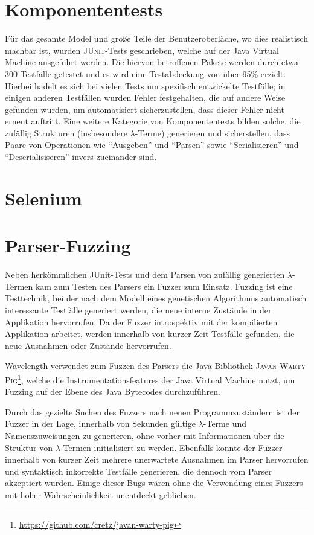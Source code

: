 \documentclass[parskip=full,11pt,openany]{scrreprt}
\begin{document}
\section{Komponententests}
Für das gesamte Model und große Teile der Benutzeroberläche, wo dies realistisch
machbar ist, wurden \textsc{JUnit}-Tests geschrieben, welche auf der Java Virtual
Machine ausgeführt werden. Die hiervon betroffenen Pakete werden durch etwa 300
Testfälle getestet und es wird eine Testabdeckung von über 95\% erzielt. Hierbei
hadelt es sich bei vielen Tests um spezifisch entwickelte Testfälle; in einigen
anderen Testfällen wurden Fehler festgehalten, die auf andere Weise gefunden
wurden, um automatisiert sicherzustellen, dass dieser Fehler nicht erneut
auftritt. Eine weitere Kategorie von Komponententests bilden solche, die zufällig Strukturen
(insbesondere $\lambda$-Terme) generieren und sicherstellen, dass Paare von
Operationen wie \enquote{Ausgeben} und \enquote{Parsen} sowie \enquote{Serialisieren}
und \enquote{Deserialisiseren} invers zueinander sind.

\section{Selenium}

\section{Parser-Fuzzing}
Neben herkömmlichen JUnit-Tests und dem Parsen von zufällig generierten
$\lambda$-Termen kam zum Testen des Parsers ein Fuzzer zum Einsatz. Fuzzing ist
eine Testtechnik, bei der nach dem Modell eines genetischen Algorithmus
automatisch interessante Testfälle generiert werden, die neue interne Zustände
in der Applikation hervorrufen. Da der Fuzzer introspektiv mit der kompilierten
Applikation arbeitet, werden innerhalb von kurzer Zeit Testfälle gefunden, die
neue Ausnahmen oder Zustände hervorrufen.

Wavelength verwendet zum Fuzzen des Parsers die Java-Bibliothek
\textsc{Javan Warty Pig\footnote{\url{https://github.com/cretz/javan-warty-pig}}},
welche die Instrumentationsfeatures der Java Virtual Machine nutzt, um Fuzzing
auf der Ebene des Java Bytecodes durchzuführen.

Durch das gezielte Suchen des Fuzzers nach neuen Programmzuständern ist der
Fuzzer in der Lage, innerhalb von Sekunden gültige $\lambda$-Terme und
Namenszuweisungen zu generieren, ohne vorher mit Informationen über die Struktur
von $\lambda$-Termen initialisiert zu werden. Ebenfalls konnte der Fuzzer innerhalb
von kurzer Zeit mehrere unerwartete Ausnahmen im Parser hervorrufen und syntaktisch
inkorrekte Testfälle generieren, die dennoch vom Parser akzeptiert wurden. Einige
dieser Bugs wären ohne die Verwendung eines Fuzzers mit hoher Wahrscheinlichkeit
unentdeckt geblieben.
\end{document}
